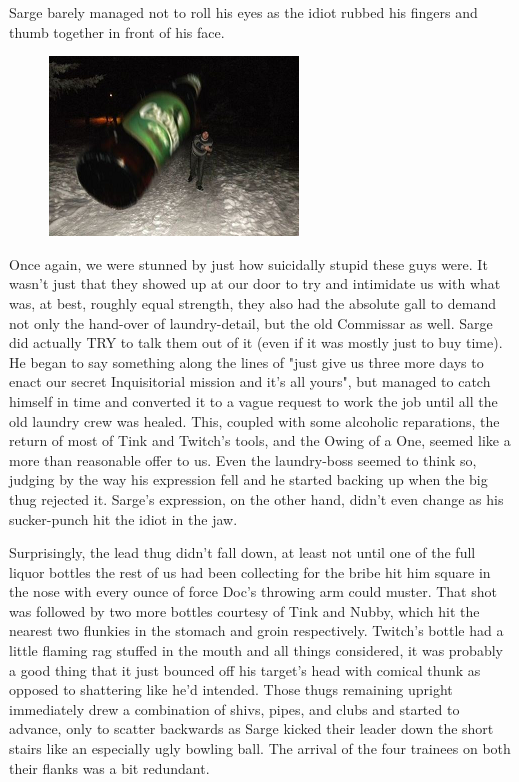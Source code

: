 Sarge barely managed not to roll his eyes as the idiot rubbed his fingers and thumb together in front of his face.

\begin{figure}
	\begin{center}
		\includegraphics[width=\figwidth]{pics/21/37.png}
	\end{center}
\end{figure}
Once again, we were stunned by just how suicidally stupid these guys were. 
It wasn't just that they showed up at our door to try and intimidate us with what was, at best, roughly equal strength, they also had the absolute gall to demand not only the hand-over of laundry-detail, but the old Commissar as well. 
Sarge did actually TRY to talk them out of it (even if it was mostly just to buy time). 
He began to say something along the lines of "just give us three more days to enact our secret Inquisitorial mission and it's all yours", but managed to catch himself in time and converted it to a vague request to work the job until all the old laundry crew was healed. 
This, coupled with some alcoholic reparations, the return of most of Tink and Twitch's tools, and the Owing of a One, seemed like a more than reasonable offer to us. 
Even the laundry-boss seemed to think so, judging by the way his expression fell and he started backing up when the big thug rejected it. 
Sarge's expression, on the other hand, didn't even change as his sucker-punch hit the idiot in the jaw. 


Surprisingly, the lead thug didn't fall down, at least not until one of the full liquor bottles the rest of us had been collecting for the bribe hit him square in the nose with every ounce of force Doc's throwing arm could muster. 
That shot was followed by two more bottles courtesy of Tink and Nubby, which hit the nearest two flunkies in the stomach and groin respectively. 
Twitch's bottle had a little flaming rag stuffed in the mouth and all things considered, it was probably a good thing that it just bounced off his target's head with comical thunk as opposed to shattering like he'd intended. 
Those thugs remaining upright immediately drew a combination of shivs, pipes, and clubs and started to advance, only to scatter backwards as Sarge kicked their leader down the short stairs like an especially ugly bowling ball. 
The arrival of the four trainees on both their flanks was a bit redundant.

